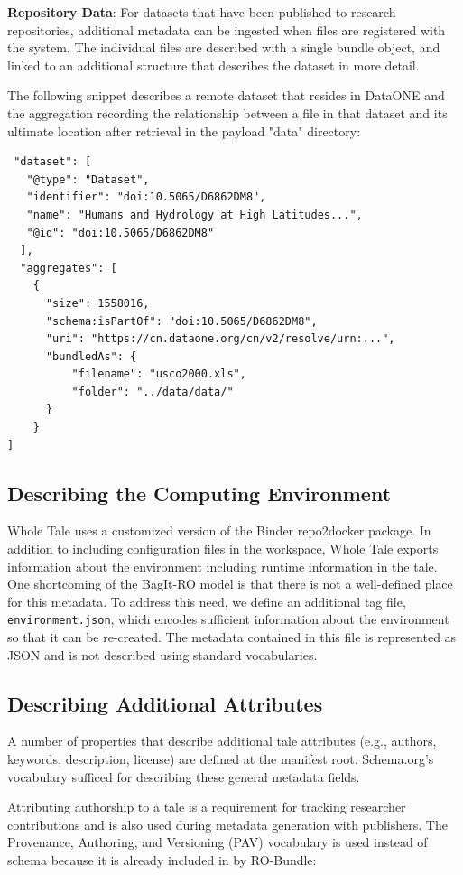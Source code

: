 \documentclass[conference]{IEEEtran}
\begin{document}
{\bf Repository Data}: 
For datasets that have been published to research repositories, additional metadata can be ingested when files are registered with the system. The individual files are described with a single bundle object, and linked to an additional structure that describes the dataset in more detail.

The following snippet describes a remote dataset that resides in DataONE and the aggregation recording the relationship between a file in that dataset and its ultimate location after 
retrieval in the payload "data" directory:


\begin{lstlisting}
 "dataset": [
   "@type": "Dataset",
   "identifier": "doi:10.5065/D6862DM8",
   "name": "Humans and Hydrology at High Latitudes...",
   "@id": "doi:10.5065/D6862DM8"
  ],
  "aggregates": [
    {
      "size": 1558016,
      "schema:isPartOf": "doi:10.5065/D6862DM8",
      "uri": "https://cn.dataone.org/cn/v2/resolve/urn:...",
      "bundledAs": {
          "filename": "usco2000.xls",
          "folder": "../data/data/"
      }
    }
]
\end{lstlisting}

\subsection{Describing the Computing Environment}
Whole Tale uses a customized version of the Binder repo2docker package. In addition to including configuration files in the workspace, Whole Tale exports information about the environment including runtime information in the tale. One shortcoming of the BagIt-RO model is that there is not a well-defined place for this metadata. To address this need, we define an additional tag file, \texttt{environment.json}, which encodes sufficient information about the environment  so that it can be re-created. The metadata contained in this file is represented as JSON and is not described using standard vocabularies. 

\subsection{Describing Additional Attributes}
A number of properties that describe additional tale attributes (e.g., authors, keywords, description, license) are defined at the manifest root. Schema.org's vocabulary sufficed for describing these general metadata fields.

Attributing authorship to a tale is a requirement for tracking researcher contributions and is also used during metadata generation with publishers. The Provenance, Authoring, and Versioning (PAV) vocabulary is used instead of schema because it is already included in by RO-Bundle: 
\end{document}
